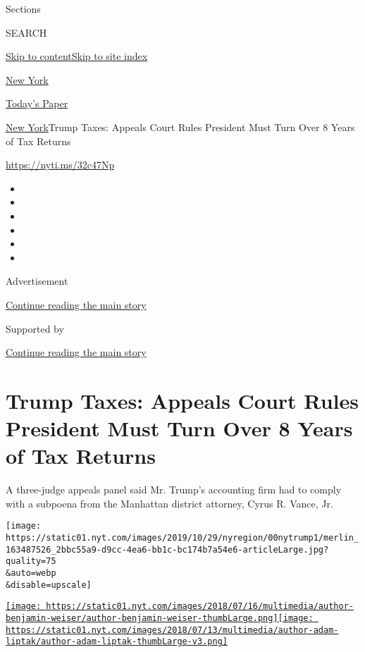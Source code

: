 Sections

SEARCH

\protect\hyperlink{site-content}{Skip to
content}\protect\hyperlink{site-index}{Skip to site index}

\href{https://www.nytimes.com/section/nyregion}{New York}

\href{https://myaccount.nytimes.com/auth/login?response_type=cookie\&client_id=vi}{}

\href{https://www.nytimes.com/section/todayspaper}{Today's Paper}

\href{/section/nyregion}{New York}\textbar{}Trump Taxes: Appeals Court
Rules President Must Turn Over 8 Years of Tax Returns

\url{https://nyti.ms/32c47Np}

\begin{itemize}
\item
\item
\item
\item
\item
\item
\end{itemize}

Advertisement

\protect\hyperlink{after-top}{Continue reading the main story}

Supported by

\protect\hyperlink{after-sponsor}{Continue reading the main story}

\hypertarget{trump-taxes-appeals-court-rules-president-must-turn-over-8-years-of-tax-returns}{%
\section{Trump Taxes: Appeals Court Rules President Must Turn Over 8
Years of Tax
Returns}\label{trump-taxes-appeals-court-rules-president-must-turn-over-8-years-of-tax-returns}}

A three-judge appeals panel said Mr. Trump's accounting firm had to
comply with a subpoena from the Manhattan district attorney, Cyrus R.
Vance, Jr.

\texttt{[image: https://static01.nyt.com/images/2019/10/29/nyregion/00nytrump1/merlin\_163487526\_2bbc55a9-d9cc-4ea6-bb1c-bc174b7a54e6-articleLarge.jpg?quality=75\\\&auto=webp\\\&disable=upscale]}

\href{https://www.nytimes.com/by/benjamin-weiser}{\texttt{[image: https://static01.nyt.com/images/2018/07/16/multimedia/author-benjamin-weiser/author-benjamin-weiser-thumbLarge.png]}}\href{https://www.nytimes.com/by/adam-liptak}{\texttt{[image: https://static01.nyt.com/images/2018/07/13/multimedia/author-adam-liptak/author-adam-liptak-thumbLarge-v3.png]}}


